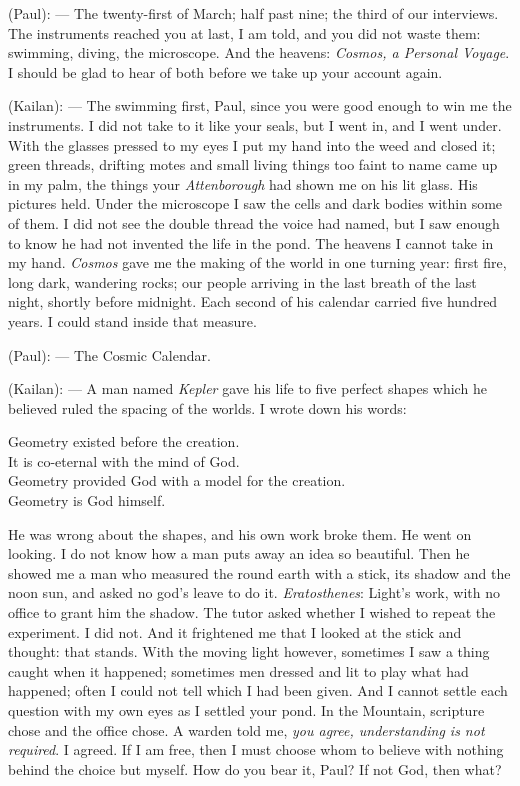 
\begin{room}

(Paul): --- The twenty-first of March; half past nine; the third of our interviews. The instruments reached you at last, I am told, and you did not waste them: swimming, diving, the microscope. And the heavens: \textit{Cosmos, a Personal Voyage}. I should be glad to hear of both before we take up your account again.

(Kailan): --- The swimming first, Paul, since you were good enough to win me the instruments. I did not take to it like your seals, but I went in, and I went under. With the glasses pressed to my eyes I put my hand into the weed and closed it; green threads, drifting motes and small living things too faint to name came up in my palm, the things your \textit{Attenborough} had shown me on his lit glass. His pictures held. Under the microscope I saw the cells and dark bodies within some of them. I did not see the double thread the voice had named, but I saw enough to know he had not invented the life in the pond. The heavens I cannot take in my hand. \textit{Cosmos} gave me the making of the world in one turning year: first fire, long dark, wandering rocks; our people arriving in the last breath of the last night, shortly before midnight. Each second of his calendar carried five hundred years. I could stand inside that measure.

(Paul): --- The Cosmic Calendar.

(Kailan): --- A man named \textit{Kepler} gave his life to five perfect shapes which he believed ruled the spacing of the worlds. I wrote down his words:

\begin{scripture}
Geometry existed before the creation. \\
It is co-eternal with the mind of God. \\
Geometry provided God with a model for the creation. \\
Geometry is God himself.\\
\end{scripture}

He was wrong about the shapes, and his own work broke them. He went on looking. I do not know how a man puts away an idea so beautiful. Then he showed me a man who measured the round earth with a stick, its shadow and the noon sun, and asked no god's leave to do it. \textit{Eratosthenes}: Light's work, with no office to grant him the shadow. The tutor asked whether I wished to repeat the experiment. I did not. And it frightened me that I looked at the stick and thought: that stands. With the moving light however, sometimes I saw a thing caught when it happened; sometimes men dressed and lit to play what had happened; often I could not tell which I had been given. And I cannot settle each question with my own eyes as I settled your pond. In the Mountain, scripture chose and the office chose. A warden told me, \textit{you agree, understanding is not required}. I agreed. If I am free, then I must choose whom to believe with nothing behind the choice but myself. How do you bear it, Paul? If not God, then what?


\end{room}
